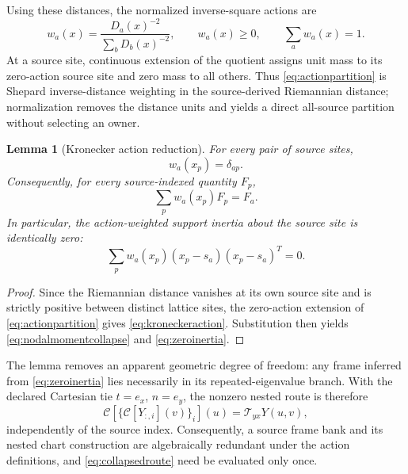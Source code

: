 \documentclass[journal]{IEEEtran}
\newtheorem{lemma}{Lemma}
\newcommand{\Tcal}{\mathcal{T}}
\begin{document}
Using these distances, the normalized inverse-square actions are
\begin{equation}
 w_a(x)=\frac{D_a(x)^{-2}}{\sum_bD_b(x)^{-2}},
 \qquad w_a(x)\geq0,\qquad\sum_aw_a(x)=1.
 \label{eq:actionpartition}
\end{equation}
At a source site, continuous extension of the quotient assigns unit mass to
its zero-action source site and zero mass to all others. Thus
\eqref{eq:actionpartition} is Shepard inverse-distance weighting
\cite{shepard1968} in the source-derived Riemannian distance; normalization
removes the distance units and yields a direct all-source partition without
selecting an owner.

\begin{lemma}[Kronecker action reduction]
For every pair of source sites,
\begin{equation}
 w_a(x_p)=\delta_{ap}.
 \label{eq:kroneckeraction}
\end{equation}
Consequently, for every source-indexed quantity \(F_p\),
\begin{equation}
 \sum_pw_a(x_p)F_p=F_a.
 \label{eq:nodalmomentcollapse}
\end{equation}
In particular, the action-weighted support inertia about the source site is
identically zero:
\begin{equation}
 \sum_pw_a(x_p)(x_p-s_a)(x_p-s_a)^T=0.
 \label{eq:zeroinertia}
\end{equation}
\end{lemma}

\begin{proof}
Since the Riemannian distance vanishes at its own source site and is strictly
positive between distinct lattice sites, the zero-action extension of
\eqref{eq:actionpartition} gives \eqref{eq:kroneckeraction}. Substitution then
yields \eqref{eq:nodalmomentcollapse} and \eqref{eq:zeroinertia}.
\end{proof}

The lemma removes an apparent geometric degree of freedom: any frame inferred
from \eqref{eq:zeroinertia} lies necessarily in its repeated-eigenvalue
branch. With the declared Cartesian tie \(t=e_x\), \(n=e_y\), the nonzero
nested route is therefore
\begin{equation}
 \mathcal C\!\left[
   \{\mathcal C[Y_{:,i}](v)\}_{i}
 \right](u)=\Tcal_{yx}Y(u,v),
 \label{eq:collapsedroute}
\end{equation}
independently of the source index. Consequently, a source frame bank and its
nested chart construction are algebraically redundant under the action
definitions, and \eqref{eq:collapsedroute} need be evaluated only once.
\end{document}
